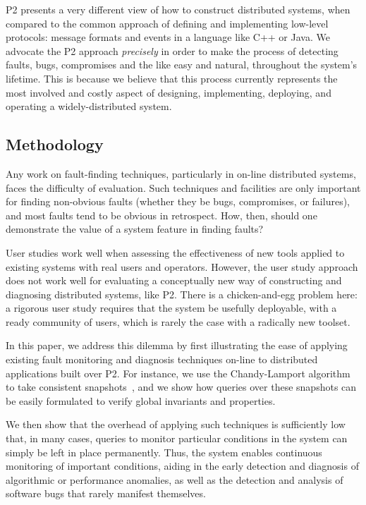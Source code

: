 \documentclass{sig-alt-full}
\def\Sys{P2\xspace}
\begin{document}
\Sys presents a very different view of how to construct distributed
systems, when compared to the common approach of defining and
implementing low-level protocols: message formats and events in a
language like C++ or Java.  We advocate the \Sys approach
\emph{precisely} in order to make the process of detecting faults,
bugs, compromises and the like easy and natural, throughout the
system's lifetime.  This is because we believe that this process
currently represents the most involved and costly aspect of designing,
implementing, deploying, and operating a widely-distributed system.


\subsection{Methodology}

Any work on fault-finding techniques, particularly in on-line
distributed systems, faces the difficulty of evaluation.  Such
techniques and facilities are only important for finding non-obvious
faults (whether they be bugs, compromises, or failures), and most
faults tend to be obvious in retrospect.  How, then, should one
demonstrate the value of a system feature in finding faults?

User studies work well when assessing the effectiveness of new tools
applied to existing systems with real users and operators.  However,
the user study approach does not work well for evaluating a
conceptually new way of constructing and diagnosing distributed
systems, like \Sys.  There is a chicken-and-egg problem here: a
rigorous user study requires that the system be usefully deployable,
with a ready community of users, which is rarely the case with a
radically new toolset.

In this paper, we address this dilemma by first illustrating the ease
of applying existing fault monitoring and diagnosis techniques on-line
to distributed applications built over \Sys. For instance, we use the
Chandy-Lamport algorithm to take consistent snapshots~\cite{Chandy1985}, and we show how
queries over these snapshots can be easily formulated to verify
global invariants and properties.

We then show that the overhead of applying such techniques is
sufficiently low that, in many cases, queries to monitor particular
conditions in the system can simply be left in place
permanently. Thus, the system enables continuous monitoring of
important conditions, aiding in the early detection and diagnosis of
algorithmic or performance anomalies, as well as the detection
and analysis of software bugs that rarely manifest themselves.
\end{document}
